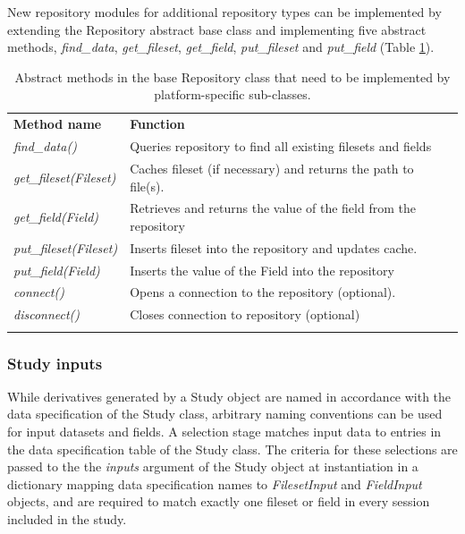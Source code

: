 \documentclass[smallextended]{svjour3}       %
\begin{document}
New repository modules for additional repository types can be
implemented by extending the Repository abstract base class and
implementing five abstract methods, \emph{find\_data}, \emph{get\_fileset},
\emph{get\_field}, \emph{put\_fileset} and \emph{put\_field}
(Table \ref{tbl:abstract-repo-methods}).

\begin{table}
\caption{Abstract methods in the base Repository class that
need to be implemented by platform-specific sub-classes.}
\label{tbl:abstract-repo-methods} 
\begin{tabular}{ll}
\hline\noalign{\smallskip}
\textbf{Method name} & \textbf{Function} \\
\noalign{\smallskip}\hline\noalign{\smallskip}
\emph{find\_data()} & Queries repository to find all existing filesets and
fields \\
\emph{get\_fileset(Fileset)} & Caches fileset (if necessary) and returns the path to file(s). \\
\emph{get\_field(Field)} & Retrieves and returns the value of the field from
the repository \\
\emph{put\_fileset(Fileset)} & Inserts fileset into the repository and updates cache. \\
\emph{put\_field(Field)} & Inserts the value of the Field into the repository \\
\emph{connect()} & Opens a connection to the repository (optional). \\
\emph{disconnect()} & Closes connection to repository (optional)\\
\noalign{\smallskip}\hline
\end{tabular}
\end{table}

\subsubsection*{Study inputs}
\label{study-inputs}

While derivatives generated by a Study object are named in accordance
with the data specification of the Study class, arbitrary naming
conventions can be used for input datasets and fields. A selection
stage matches input data to entries in the data specification table of
the Study class. The criteria for these selections are passed to the
the \emph{inputs} argument of the Study object at instantiation in a
dictionary mapping data specification names to \emph{FilesetInput} and
\emph{FieldInput} objects, and are required
to match exactly one fileset or field in every session included in the study.
\end{document}
